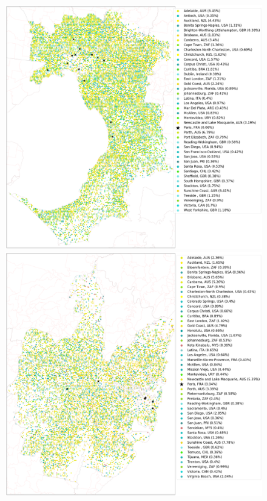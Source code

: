 \documentclass[sageh,times]{sagej}
\begin{document}


\begin{figure}[!htbp]
\centering    
\includegraphics[scale=0.15]{Images/MelbourneOverallAbrev_street.png} 
\includegraphics[scale=0.15]{Images/SydneyOverallAbrev_street.png}  

\end{figure}
\end{document}
